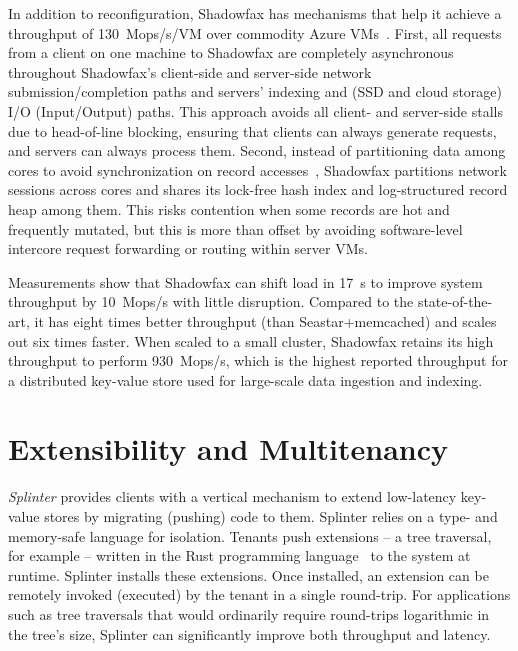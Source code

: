 In addition to reconfiguration, Shadowfax has mechanisms that help it
achieve a throughput of 130~Mops/s/VM over
commodity Azure VMs~\cite{azure}.
%
First, all requests from a client on one machine to Shadowfax are
completely asynchronous throughout Shadowfax's client-side and
server-side network submission/completion paths and servers' indexing and
(SSD and cloud storage) I/O (Input/Output) paths.
%
This approach avoids all client- and server-side stalls due to head-of-line
blocking, ensuring that clients can always generate
requests, and
servers can always process them.
%
Second, instead of partitioning data among cores to avoid synchronization on record
accesses~\cite{hstore,voltdb,mica,seastar}, Shadowfax partitions network
sessions across cores and shares its lock-free hash index and log-structured
record heap among them.
%
This risks contention when some records are hot and frequently
mutated, but this is more than offset by avoiding software-level
intercore request forwarding or routing within server VMs.

Measurements show that Shadowfax can shift load in 17~s to improve system throughput by
10~Mops/s
with little disruption. Compared to the state-of-the-art, it has eight
times better throughput
  (than Seastar+memcached) and scales out six times faster.
%
When scaled to a small cluster, Shadowfax retains its high throughput to
perform 930~Mops/s,
%
which is the highest
reported throughput for a distributed key-value store used for
large-scale data ingestion and indexing.

\section{Extensibility and Multitenancy}

\emph{Splinter} provides clients with a vertical mechanism
to extend low-latency key-value stores by migrating (pushing) code to them.
%
Splinter relies on a type- and memory-safe language for isolation.
%
Tenants push
extensions – a tree traversal, for example – written in the Rust
programming language~\cite{rust} to the system at runtime.
%
Splinter installs
these extensions.
%
Once installed, an extension can
be remotely invoked (executed) by the tenant in a
single round-trip.
%
For applications such as tree traversals that would ordinarily require
round-trips logarithmic in the tree's size, Splinter can
significantly improve both throughput and latency.

